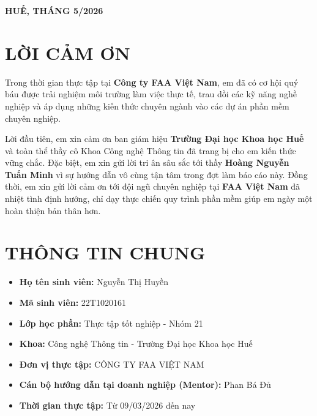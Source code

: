 \documentclass[12pt, a4paper]{article}
\begin{document}
\begin{titlepage}
    \vfill
    \begin{center}
        \textbf{HUẾ, THÁNG 5/2026}
    \end{center}
    \restoregeometry
\end{titlepage}

\newpage

\section*{LỜI CẢM ƠN}
Trong thời gian thực tập tại \textbf{Công ty FAA Việt Nam}, em đã có cơ hội quý báu được trải nghiệm môi trường làm việc thực tế, trau dồi các kỹ năng nghề nghiệp và áp dụng những kiến thức chuyên ngành vào các dự án phần mềm chuyên nghiệp. 

Lời đầu tiên, em xin cảm ơn ban giám hiệu \textbf{Trường Đại học Khoa học Huế} và toàn thể thầy cô Khoa Công nghệ Thông tin đã trang bị cho em kiến thức vững chắc. Đặc biệt, em xin gửi lời tri ân sâu sắc tới thầy \textbf{Hoàng Nguyễn Tuấn Minh} vì sự hướng dẫn vô cùng tận tâm trong đợt làm báo cáo này. Đồng thời, em xin gửi lời cảm ơn tới đội ngũ chuyên nghiệp tại \textbf{FAA Việt Nam} đã nhiệt tình định hướng, chỉ dạy thực chiến quy trình phần mềm giúp em ngày một hoàn thiện bản thân hơn.

\newpage
\renewcommand{\contentsname}{MỤC LỤC}
\tableofcontents
\newpage


\section{THÔNG TIN CHUNG}
\begin{itemize}
    \item \textbf{Họ tên sinh viên:} Nguyễn Thị Huyền
    \item \textbf{Mã sinh viên:} 22T1020161
    \item \textbf{Lớp học phần:} Thực tập tốt nghiệp - Nhóm 21
    \item \textbf{Khoa:} Công nghệ Thông tin - Trường Đại học Khoa học Huế
    \item \textbf{Đơn vị thực tập:} CÔNG TY FAA VIỆT NAM
    \item \textbf{Cán bộ hướng dẫn tại doanh nghiệp (Mentor):} Phan Bá Đủ
    \item \textbf{Thời gian thực tập:} Từ 09/03/2026 đến nay
\end{itemize}
\end{document}
